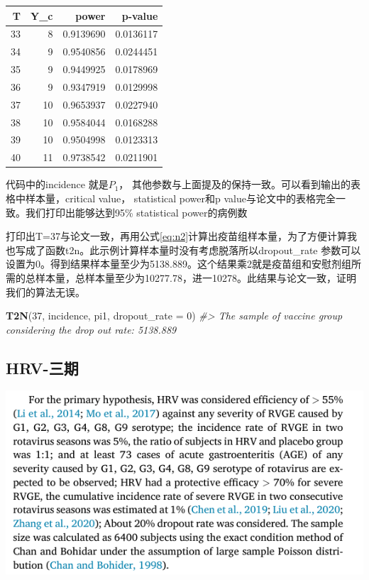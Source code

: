 \documentclass[
]{book}
\newenvironment{Shaded}{\begin{snugshade}}{\end{snugshade}}
\newcommand{\AttributeTok}[1]{\textcolor[rgb]{0.13,0.29,0.53}{#1}}
\newcommand{\CommentTok}[1]{\textcolor[rgb]{0.56,0.35,0.01}{\textit{#1}}}
\newcommand{\DecValTok}[1]{\textcolor[rgb]{0.00,0.00,0.81}{#1}}
\newcommand{\FunctionTok}[1]{\textcolor[rgb]{0.13,0.29,0.53}{\textbf{#1}}}
\newcommand{\NormalTok}[1]{#1}
\newcommand{\SpecialCharTok}[1]{\textcolor[rgb]{0.81,0.36,0.00}{\textbf{#1}}}
\begin{document}
\begin{tabular}[t]{r|r|r|r}
\hline
T & Y\_c & power & p-value\\
\hline
33 & 8 & 0.9139690 & 0.0136117\\
\hline
34 & 9 & 0.9540856 & 0.0244451\\
\hline
35 & 9 & 0.9449925 & 0.0178969\\
\hline
36 & 9 & 0.9347919 & 0.0129998\\
\hline
37 & 10 & 0.9653937 & 0.0227940\\
\hline
38 & 10 & 0.9584044 & 0.0168288\\
\hline
39 & 10 & 0.9504998 & 0.0123313\\
\hline
40 & 11 & 0.9738542 & 0.0211901\\
\hline
\end{tabular}

代码中的incidence 就是\(P_1\)， 其他参数与上面提及的保持一致。可以看到输出的表格中样本量，critical value， statistical power和p value与论文中的表格完全一致。我们打印出能够达到95\% statistical power的病例数

\begin{Shaded}
\end{Shaded}

打印出T=37与论文一致，再用公式\eqref{eq:n2}计算出疫苗组样本量，为了方便计算我也写成了函数t2n。此示例计算样本量时没有考虑脱落所以dropout\_rate 参数可以设置为0。得到结果样本量至少为5138.889。这个结果乘2就是疫苗组和安慰剂组所需的总样本量，总样本量至少为10277.78，进一10278。此结果与论文一致，证明我们的算法无误。

\begin{Shaded}
\begin{Highlighting}[]
\FunctionTok{T2N}\NormalTok{(}\DecValTok{37}\NormalTok{, incidence, pi1, }\AttributeTok{dropout\_rate =} \DecValTok{0}\NormalTok{)}
\CommentTok{\#\textgreater{} The sample of vaccine group considering the drop out rate: 5138.889}
\end{Highlighting}
\end{Shaded}

\subsection{HRV-三期}\label{hrv-ux4e09ux671f}

\includegraphics[width=7.88in]{image/Screenshot 2025-07-22 173413}
\end{document}
